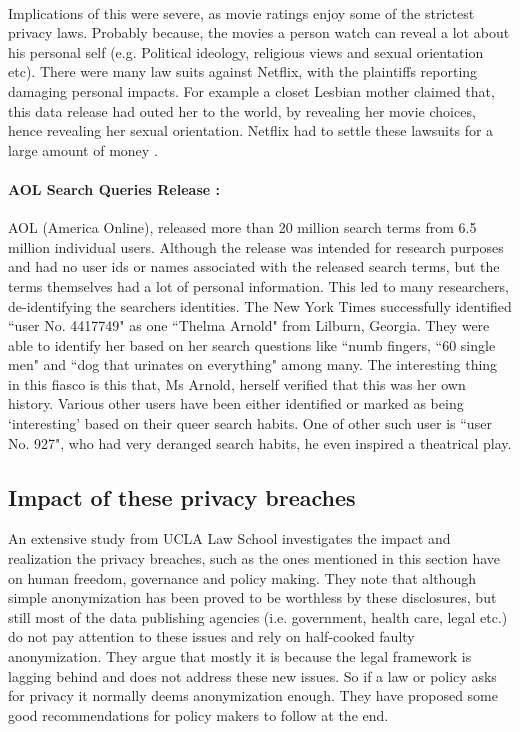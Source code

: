 \documentclass[12pt]{report}
\theoremstyle{named}
\begin{document}
\paragraph{}
Implications of this were severe, as movie ratings enjoy some of the strictest privacy laws. Probably because, the movies a person watch can reveal a lot about his personal self (e.g. Political ideology, religious views and sexual orientation etc). There were many law suits against Netflix, with the plaintiffs reporting damaging personal impacts. For example a closet Lesbian mother claimed that, this data release had outed her to the world, by revealing her movie choices, hence revealing her sexual orientation. Netflix had to settle these lawsuits for a large amount of money \cite{netFlixSetlement}.



\paragraph{AOL Search Queries Release \cite{barbaro2006face}:\\}
AOL (America Online), released more than 20 million search terms from 6.5 million individual users. Although the release was intended for research purposes and had no user ids or names associated with the released search terms, but the terms themselves had a lot of personal information. This led to many researchers, de-identifying the searchers identities. The New York Times successfully identified ``user No. 4417749" as one ``Thelma Arnold" from Lilburn, Georgia. They were able to identify her based on her search questions like ``numb fingers, ``60 single men" and ``dog that urinates on everything" among many. The interesting thing in this fiasco is this that, Ms Arnold, herself verified that this was her own history. Various other users have been either identified or marked as being `interesting' based on their queer search habits. One of other such user is ``user No. 927", who had very deranged search habits, he even inspired a theatrical play.


\subsection{Impact of these privacy breaches}
An extensive study \cite{ohm2009broken} from  UCLA Law School investigates the impact and realization the privacy breaches, such as the ones mentioned in this section have on human freedom, governance and policy making. They note that although simple anonymization has been proved to be worthless by these disclosures, but still most of the data publishing agencies (i.e. government, health care, legal etc.) do not pay attention to these issues and rely on half-cooked faulty anonymization. They argue that mostly it is because the legal framework is lagging behind and does not address these new issues. So if a law or policy asks for privacy it normally deems anonymization enough. They have proposed some good recommendations for policy makers to follow at the end.
\end{document}
